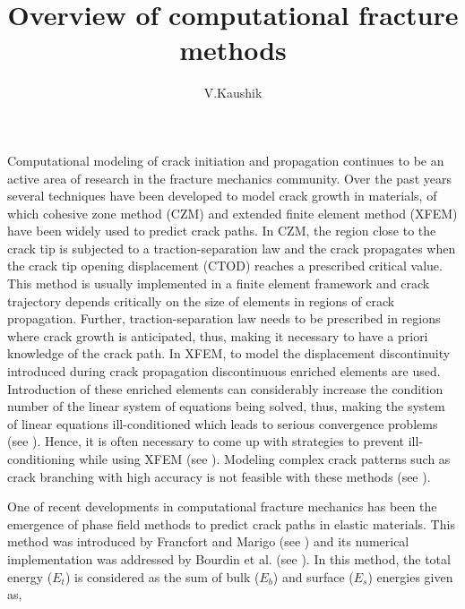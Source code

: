 \documentclass[11pt] {article}
\begin{document}
\title{Overview of computational fracture methods}
\author{V.Kaushik}
\maketitle
Computational modeling of crack initiation and propagation continues to be an active area of research in the fracture mechanics community. Over the past years several techniques have been developed to model crack growth in materials, of which cohesive zone method (CZM) \cite{xu_1994,camacho_1996} and extended finite element method (XFEM) \cite{dolbow_1999} have been widely used to predict crack paths. In CZM, the region close to the crack tip is subjected to a traction-separation law and the crack propagates when the crack tip opening displacement (CTOD) reaches a prescribed critical value. This method is usually implemented in a finite element framework and crack trajectory depends critically on the size of elements in regions of crack propagation. Further, traction-separation law needs to be prescribed in regions where crack growth is anticipated, thus, making it necessary to have a priori knowledge of the crack path. In XFEM, to model the displacement discontinuity introduced during crack propagation discontinuous enriched elements are used. Introduction of these enriched elements can considerably increase the condition number of the linear system of equations being solved, thus, making the system of linear equations ill-conditioned which leads to serious convergence problems (see \cite{lasry_2010}). Hence, it is often necessary to come up with strategies to prevent ill-conditioning while using XFEM (see \cite{zhao_2014,xiao_2007l}). Modeling complex crack patterns such as crack branching with high accuracy is not feasible with these methods (see \cite{song_2008}). 
\par
One of recent developments in computational fracture mechanics has been the emergence of phase field methods to predict crack paths in elastic materials. This method was introduced by Francfort and Marigo (see \cite{francfort_1998}) and its numerical implementation was addressed by Bourdin et al. (see \cite{bourdin_2000}). In this method, the total energy ($E_t$) is considered as the sum of bulk ($E_b$) and surface ($E_s$) energies given as,
\end{document}
